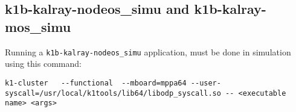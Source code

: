 \documentclass{trkalray}
\begin{document}
\subsection{k1b-kalray-nodeos\_simu and k1b-kalray-mos\_simu}
Running a \texttt{k1b-kalray-nodeos\_simu} application, must be done in
simulation using this command:
\begin{lstlisting}
k1-cluster   --functional  --mboard=mppa64 --user-syscall=/usr/local/k1tools/lib64/libodp_syscall.so -- <executable name> <args>
\end{lstlisting}
\end{document}
